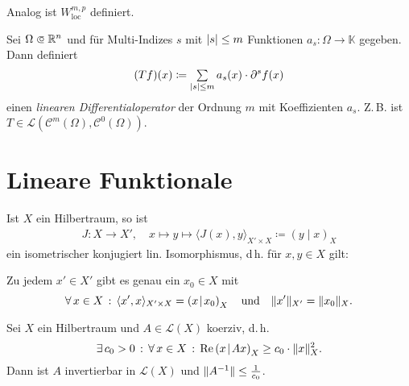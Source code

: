 \documentclass{cheat-sheet}
\newcommand{\K}{\mathbb{K}}
\newcommand{\LSO}{\mathcal{L}} %
\newcommand{\scp}[2]{\left( #1 \!\mid\! #2 \right)} %
\renewcommand{\Re}{\operatorname{Re}} %
\begin{document}
\begin{bem}
  Analog ist $W_{\mathrm{loc}}^{m,p}$ definiert.
\end{bem}

\begin{defn}
  Sei $\Omega \opn \R^n$ und für Multi-Indizes $s$ mit $\lvert s\rvert \leq m$ Funktionen $a_s : \Omega \to \K$ gegeben. Dann definiert
  \[ (Tf)(x) \coloneqq \sum_{\abs{s} \leq m} a_s(x) \cdot \partial^s f(x) \]
  einen \emph{linearen Differentialoperator} der Ordnung $m$ mit Koeffizienten $a_s$. Z.\,B. ist $T \in \LSO(\mathcal{C}^m(\Omega), \mathcal{C}^0(\Omega))$.
\end{defn}

\section{Lineare Funktionale}

\begin{satz}
  Ist $X$ ein Hilbertraum, so ist
  \begin{align*}
    J : X \to X', \quad x \mapsto y \mapsto \langle J(x), y \rangle_{X' {\times} X} \coloneqq \scp{y}{x}_X
  \end{align*}
  ein isometrischer konjugiert lin. Isomorphismus, d\,h. für $x, y \in X$ gilt:
  \begin{itemize}
    \miniitem{0.56 \linewidth}{$\fa{\alpha \in \K} J(\alpha x + y) = \overline{\alpha} Jx + Jy$}
  \end{itemize}
\end{satz}

\begin{umformulierung}
  Zu jedem $x' \in X'$ gibt es genau ein $x_0 \in X$ mit
  \[
    \fa{x \in X} \langle x', x \rangle_{X' {\times} X} = \scp{x}{x_0}_X
    \quad \text{und} \quad
    \norm{x'}_{X'} = \norm{x_0}_{X}.
  \]
\end{umformulierung}

\begin{lem}
  Sei $X$ ein Hilbertraum und $A \in \LSO(X)$ koerziv, d.\,h.
  \[ \ex{c_0 > 0} \fa{x \in X} \Re \scp{x}{Ax}_X \geq c_0 \cdot \norm{x}_X^2. \]
  Dann ist $A$ invertierbar in $\LSO(X)$ und $\lVert A^{-1}\rVert \leq \tfrac{1}{c_0}$.
\end{lem}
\end{document}
